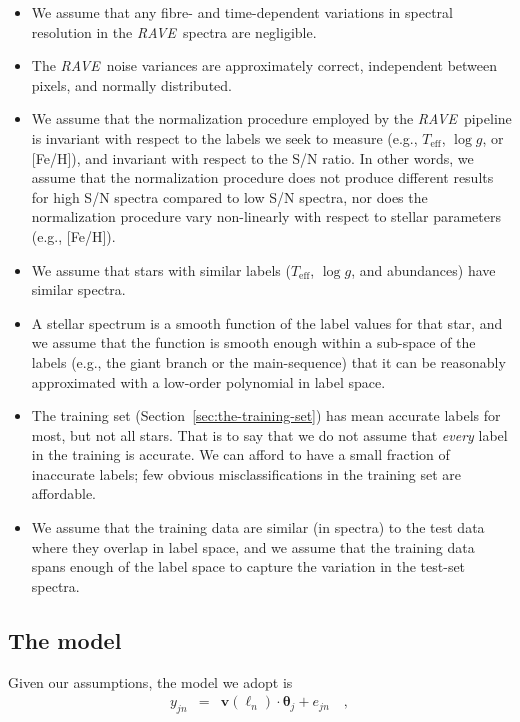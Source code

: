 \documentclass[preprint,trackchanges]{aastex}
\newcommand{\acronym}[1]{{\small{#1}}}
\newcommand{\project}[1]{\textsl{#1}}
\newcommand{\rave}{\project{\acronym{RAVE}}}
\newcommand{\teff}{T_{\mathrm{eff}}}
\newcommand{\logg}{\log g}
\newcommand{\Dvector}[1]{\boldsymbol{#1}}
\newcommand{\vectheta}{\Dvector{\theta}}
\newcommand{\vecv}{\Dvector{v}}
\begin{document}
\begin{itemize}
\item We assume that any fibre- and time-dependent variations in spectral
resolution in the \rave\ spectra are negligible.
\item The \rave\ noise variances are approximately correct, independent between
pixels, and normally distributed.
\item We assume that the normalization procedure employed by the \rave\ pipeline
is invariant with respect to the labels we seek to measure (e.g., $\teff$, $\logg$,
or [Fe/H]), and invariant with respect to the S/N ratio.  In other words, we assume
that the normalization procedure does not produce different results for high S/N
spectra compared to low S/N spectra, nor does the normalization procedure vary 
non-linearly with respect to stellar parameters (e.g., [Fe/H]).
\item We assume that stars with similar labels ($\teff$, $\logg$, and abundances)
have similar spectra.
\item A stellar spectrum is a smooth function of the label values for that star,
and we assume that the function is smooth enough within a sub-space of the labels
(e.g., the giant branch or the main-sequence) that it can be reasonably approximated 
with a low-order polynomial in label space.
\item The training set (Section~\ref{sec:the-training-set}) has mean accurate labels
for most, but not all stars. That is to say that we do not assume that \emph{every} 
label in the training is accurate. We can afford to have a small fraction of 
inaccurate labels; few obvious misclassifications in the training set are affordable.
\item We assume that the training data are similar (in spectra) to the test data 
where they overlap in label space, and we assume that the training data spans enough
of the label space to capture the variation in the test-set spectra.
\end{itemize}


\subsection{The model}
\label{sec:the-model}


\noindent{}Given our assumptions, the model we adopt is
\begin{eqnarray}\label{eq:model}
y_{jn} & = & \vecv(\ell_n)\cdot\vectheta_j + e_{jn}\quad ,
\end{eqnarray}
\end{document}
